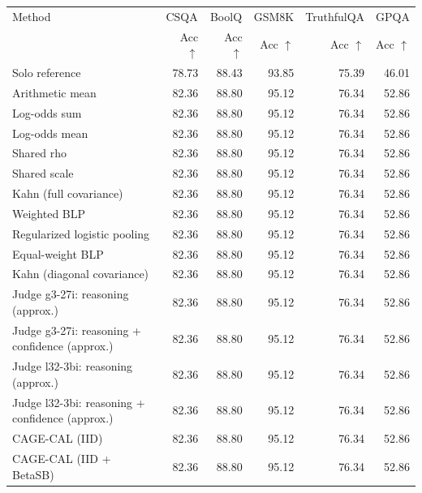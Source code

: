 \begin{tabular}{lrrrrr}
\toprule
Method & \multicolumn{1}{c}{CSQA} & \multicolumn{1}{c}{BoolQ} & \multicolumn{1}{c}{GSM8K} & \multicolumn{1}{c}{TruthfulQA} & \multicolumn{1}{c}{GPQA} \\
 & Acc $\uparrow$ & Acc $\uparrow$ & Acc $\uparrow$ & Acc $\uparrow$ & Acc $\uparrow$ \\
\midrule
Solo reference & 78.73 & 88.43 & 93.85 & 75.39 & 46.01 \\
Arithmetic mean & 82.36 & 88.80 & 95.12 & 76.34 & 52.86 \\
Log-odds sum & 82.36 & 88.80 & 95.12 & 76.34 & 52.86 \\
Log-odds mean & 82.36 & 88.80 & 95.12 & 76.34 & 52.86 \\
Shared rho & 82.36 & 88.80 & 95.12 & 76.34 & 52.86 \\
Shared scale & 82.36 & 88.80 & 95.12 & 76.34 & 52.86 \\
Kahn (full covariance) & 82.36 & 88.80 & 95.12 & 76.34 & 52.86 \\
Weighted BLP & 82.36 & 88.80 & 95.12 & 76.34 & 52.86 \\
Regularized logistic pooling & 82.36 & 88.80 & 95.12 & 76.34 & 52.86 \\
Equal-weight BLP & 82.36 & 88.80 & 95.12 & 76.34 & 52.86 \\
Kahn (diagonal covariance) & 82.36 & 88.80 & 95.12 & 76.34 & 52.86 \\
Judge g3-27i: reasoning (approx.) & 82.36 & 88.80 & 95.12 & 76.34 & 52.86 \\
Judge g3-27i: reasoning + confidence (approx.) & 82.36 & 88.80 & 95.12 & 76.34 & 52.86 \\
Judge l32-3bi: reasoning (approx.) & 82.36 & 88.80 & 95.12 & 76.34 & 52.86 \\
Judge l32-3bi: reasoning + confidence (approx.) & 82.36 & 88.80 & 95.12 & 76.34 & 52.86 \\
CAGE-CAL (IID) & 82.36 & 88.80 & 95.12 & 76.34 & 52.86 \\
CAGE-CAL (IID + BetaSB) & 82.36 & 88.80 & 95.12 & 76.34 & 52.86 \\
\bottomrule
\end{tabular}
